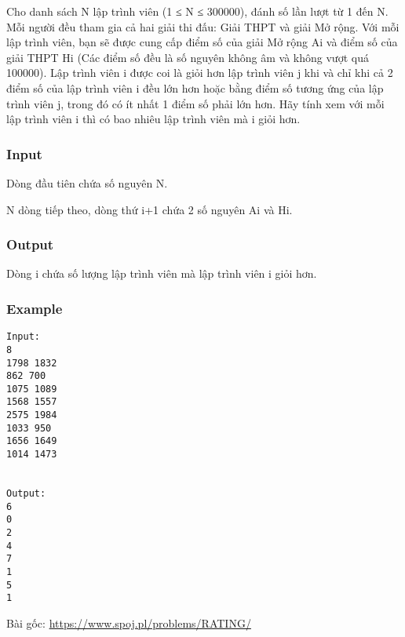 



   Cho danh sách N lập trình viên (1 ≤ N ≤ 300000), đánh số lần lượt từ 1 đến N. Mỗi người đều tham gia cả hai giải thi đấu: Giải THPT và giải Mở rộng. Với mỗi lập trình viên, bạn sẽ được cung cấp điểm số của giải Mở rộng Ai và điểm số của giải THPT Hi (Các điểm số đều là số nguyên không âm và không vượt quá 100000). Lập trình viên i được coi là giỏi hơn lập trình viên j khi và chỉ khi cả 2 điểm số của lập trình viên i đều lớn hơn hoặc bằng điểm số tương ứng của lập trình viên j, trong đó có ít nhất 1 điểm số phải lớn hơn. Hãy tính xem với mỗi lập trình viên i thì có bao nhiêu lập trình viên mà i giỏi hơn.  

\subsubsection{   Input  }

   Dòng đầu tiên chứa số nguyên N.  

   N dòng tiếp theo, dòng thứ i+1 chứa 2 số nguyên Ai và Hi.  

\subsubsection{   Output  }

   Dòng i chứa số lượng lập trình viên mà lập trình viên i giỏi hơn.  

\subsubsection{   Example  }
\begin{verbatim}
Input:
8
1798 1832
862 700
1075 1089
1568 1557
2575 1984
1033 950
1656 1649
1014 1473


Output:
6
0
2
4
7
1
5
1

\end{verbatim}

   Bài gốc:   \href{https://www.spoj.pl/problems/RATING/}{    https://www.spoj.pl/problems/RATING/   }